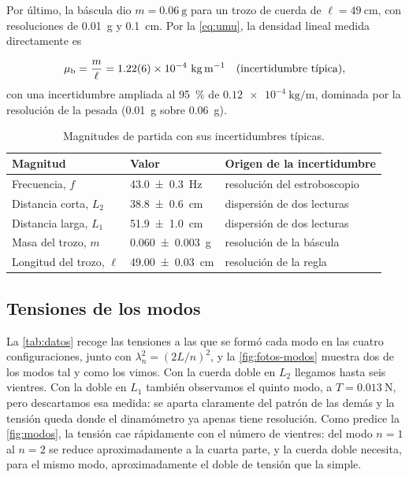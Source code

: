 \documentclass[a4paper,11pt]{amsart}
\numberwithin{equation}{section}
\newcommand{\mub}{\mu_{\mathrm{b}}}          %
\theoremstyle{cienplano}
\theoremstyle{ciendef}
\theoremstyle{cienobs}
\begin{document}
Por último, la báscula dio $m=\SI{0,06}{\gram}$ para un trozo de cuerda de
$\ell=\SI{49}{\centi\meter}$, con resoluciones de \SI{0,01}{\gram} y
\SI{0,1}{\centi\meter}. Por la \cref{eq:umu}, la densidad lineal medida
directamente es
\begin{destacado}
\vspace{-6pt}
\begin{equation}\label{eq:mub}
  \mub=\frac{m}{\ell}=\num{1,22 \pm 0,06 e-4}\ \si{\kilogram\per\meter}
  \quad(\text{incertidumbre típica}),
\end{equation}
{\small con una incertidumbre ampliada al \SI{95}{\percent} de
$\num{0,12e-4}\ \si{\kilogram\per\meter}$, dominada por la resolución de la
pesada (\SI{0,01}{\gram} sobre \SI{0,06}{\gram}).}
\end{destacado}

\begin{table}[ht]
\centering
\caption{Magnitudes de partida con sus incertidumbres típicas.}
\label{tab:partida}
\renewcommand{\arraystretch}{1.2}
\begin{tabular}{@{}l l l@{}}
\toprule
Magnitud & Valor & Origen de la incertidumbre \\
\midrule
Frecuencia, $f$             & \SI{43,0 \pm 0,3}{\hertz}         & resolución del estroboscopio \\
Distancia corta, $L_2$      & \SI{38,8 \pm 0,6}{\centi\meter}   & dispersión de dos lecturas \\
Distancia larga, $L_1$      & \SI{51,9 \pm 1,0}{\centi\meter}   & dispersión de dos lecturas \\
Masa del trozo, $m$         & \SI{0,060 \pm 0,003}{\gram}       & resolución de la báscula \\
Longitud del trozo, $\ell$  & \SI{49,00 \pm 0,03}{\centi\meter} & resolución de la regla \\
\bottomrule
\end{tabular}
\end{table}

\subsection{Tensiones de los modos}\label{sec:tensiones}
La \cref{tab:datos} recoge las tensiones a las que se formó cada modo en las
cuatro configuraciones, junto con $\lambda_n^{2}=(2L/n)^{2}$, y la
\cref{fig:fotos-modos} muestra dos de los modos tal y como los vimos. Con la
cuerda doble en $L_2$ llegamos hasta seis vientres. Con la doble en $L_1$
también observamos el quinto modo, a $T=\SI{0,013}{\newton}$, pero
descartamos esa medida: se aparta claramente del patrón de las demás y la
tensión queda donde el dinamómetro ya apenas tiene resolución. Como
predice la \cref{fig:modos}, la tensión cae rápidamente con el número de
vientres: del modo $n=1$ al $n=2$ se reduce aproximadamente a la cuarta
parte, y la cuerda doble necesita, para el mismo modo, aproximadamente el
doble de tensión que la simple.
\end{document}
